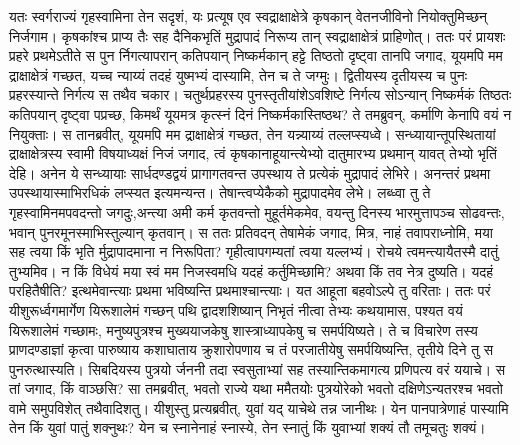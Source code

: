 \adhyAya
{}
\vakya यतः स्वर्गराज्यं गृहस्वामिना तेन सदृशं, यः प्रत्यूष एव स्वद्राक्षाक्षेत्रे कृषकान् वेतनजीविनो नियोक्तुमिच्छन् निर्जगाम।
\vakya कृषकांश्च प्राप्य तैः सह दैनिकभृतिं मुद्रापादं निरूप्य तान् स्वद्राक्षाक्षेत्रं प्राहिणोत्।
\vakya ततः परं प्रायशः प्रहरे प्रथमेऽतीते स पुन र्निगत्यापरान् कतिपयान् निष्कर्मकान् हट्टे तिष्ठतो दृष्ट्वा तानपि जगाद,
\vakya यूयमपि मम द्राक्षाक्षेत्रं गच्छत, यच्च न्याय्यं तदहं युष्मभ्यं दास्यामि, तेन च ते जग्मुः।
\vakya द्वितीयस्य दृतीयस्य च पुनः प्रहरस्यान्ते निर्गत्य स तथैव चकार।
\vakya चतुर्थप्रहरस्य पुनस्तृतीयांशेऽवशिष्टे निर्गत्य सोऽन्यान् निष्कर्मकं तिष्ठतः कतिपयान् दृष्ट्वा पप्रच्छ, किमर्थं यूयमत्र कृत्स्नं दिनं निष्कर्मकास्तिष्ठथ?
\vakya ते तमब्रुवन्, कर्माणि केनापि वयं न नियुक्ताः। स तानब्रवीत्, यूयमपि मम द्राक्षाक्षेत्रं गच्छत, तेन यन्न्याय्यं तल्लप्स्यध्वे।
\vakya सन्ध्यायान्तूपस्थितायां द्राक्षाक्षेत्रस्य स्वामी विषयाध्यक्षं निजं जगाद, त्वं कृषकानाहूयान्त्येभ्यो दातुमारभ्य प्रथमान् यावत् तेभ्यो भृतिं देहि।
\vakya अनेन ये सन्ध्यायाः सार्धदण्डद्वयं प्रागागतवन्त उपस्थाय ते प्रत्येकं मुद्रापादं लेभिरे।
\vakya अनन्तरं प्रथमा उपस्थायास्माभिरधिकं लप्स्यत इत्यमन्यन्त।
\vakya तेषान्त्वप्येकैको मुद्रापादमेव लेभे।
\vakya लब्ध्वा तु ते गृहस्वामिनमपवदन्तो जगदुः,अन्त्या अमी कर्म कृतवन्तो मुहूर्तमेकमेव, वयन्तु दिनस्य भारमुत्तापञ्च सोढवन्तः, भवान् पुनरमूनस्माभिस्तुल्यान् कृतवान्।
\vakya स ततः प्रतिवदन् तेषामेकं जगाद, मित्र, नाहं तवापराध्नोमि, मया सह त्वया किं भृति र्मुद्रापादमाना न निरूपिता?
\vakya गृहीत्वापगम्यतां त्वया यल्लभ्यं। रोचये त्वमन्त्यायैतस्मै दातुं तुभ्यमिव।
\vakya न किं विधेयं मया स्वं मम निजस्वमधि यदहं कर्तुमिच्छामि? अथवा किं तव नेत्र दुष्यति। यदहं परहितैषीति?
\vakya इत्थमेवान्त्याः प्रथमा भविष्यन्ति प्रथमाश्चान्त्याः। यत आहूता बहवोऽल्पे तु वरिताः।
\vakya ततः परं यीशुरूर्ध्वगमार्गेण यिरूशालेमं गच्छन् पथि द्वादशशिष्यान् निभृतं नीत्वा तेभ्यः कथयामास,
\vakya पश्यत वयं यिरूशालेमं गच्छामः, मनुष्यपुत्रश्च मुख्ययाजकेषु शास्त्राध्यापकेषु च समर्पयिष्यते।
\vakya ते च विचारेण तस्य प्राणदण्डाज्ञां कृत्वा पारुष्याय कशाघाताय क्रुशारोपणाय च तं परजातीयेषु समर्पयिष्यन्ति, तृतीये दिने तु स पुनरुत्थास्यति।
\vakya सिबदियस्य पुत्रयो र्जननी तदा स्वसुताभ्यां सह तस्यान्तिकमागत्य प्रणिपत्य वरं ययाचे।
\vakya स तां जगाद, किं वाञ्छसि? सा तमब्रवीत्, भवतो राज्ये यथा ममैतयोः पुत्रयोरेको भवतो दक्षिणेऽन्यतरश्च भवतो वामे समुपविशेत् तथैवादिशतु।
\vakya यीशुस्तु प्रत्यब्रवीत्, युवां यद् याचेथे तन्न जानीथः। येन पानपात्रेणाहं पास्यामि तेन किं युवां पातुं शक्नुथः? येन च स्नानेनाहं स्नास्ये, तेन स्नातुं किं युवाभ्यां शक्यं तौ तमूचतुः शक्यं।
